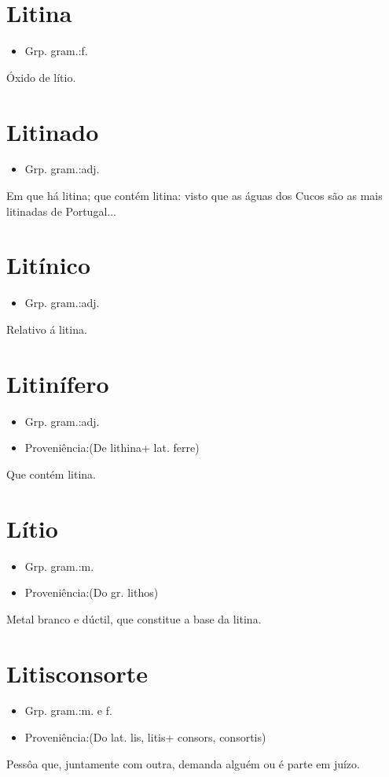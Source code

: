 \section{Litina}
\begin{itemize}
\item {Grp. gram.:f.}
\end{itemize}
Óxido de lítio.
\section{Litinado}
\begin{itemize}
\item {Grp. gram.:adj.}
\end{itemize}
Em que há litina; que contém litina: \textunderscore visto que as águas dos Cucos são as mais litinadas de Portugal...\textunderscore 
\section{Litínico}
\begin{itemize}
\item {Grp. gram.:adj.}
\end{itemize}
Relativo á litina.
\section{Litinífero}
\begin{itemize}
\item {Grp. gram.:adj.}
\end{itemize}
\begin{itemize}
\item {Proveniência:(De \textunderscore lithina\textunderscore  + lat. \textunderscore ferre\textunderscore )}
\end{itemize}
Que contém litina.
\section{Lítio}
\begin{itemize}
\item {Grp. gram.:m.}
\end{itemize}
\begin{itemize}
\item {Proveniência:(Do gr. \textunderscore lithos\textunderscore )}
\end{itemize}
Metal branco e dúctil, que constitue a base da litina.
\section{Litisconsorte}
\begin{itemize}
\item {Grp. gram.:m.  e  f.}
\end{itemize}
\begin{itemize}
\item {Proveniência:(Do lat. \textunderscore lis\textunderscore , \textunderscore litis\textunderscore  + \textunderscore consors\textunderscore , \textunderscore consortis\textunderscore )}
\end{itemize}
Pessôa que, juntamente com outra, demanda alguém ou é parte em juízo.
